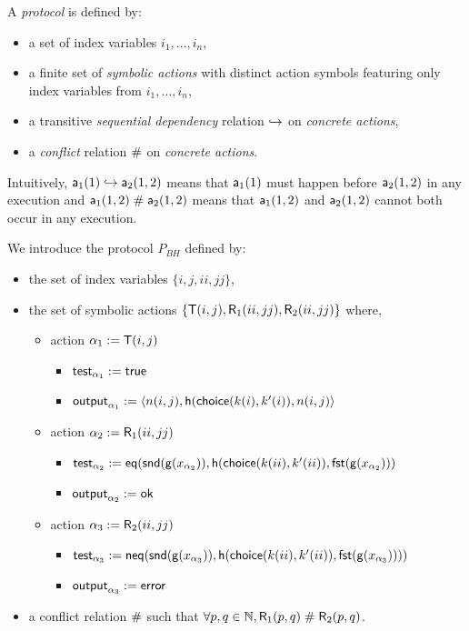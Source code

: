 \begin{definition}
  \label{def:proto}
  A \emph{protocol} is defined by:
  \begin{itemize}
    \item a set of index variables $i_1,\dots,i_n$,
    \item a finite set of \emph{symbolic actions} with distinct action symbols featuring only index variables from $i_1,\dots,i_n$,
    \item a transitive \emph{sequential dependency} relation $\hookrightarrow$ on \emph{concrete actions},
    \item a \emph{conflict} relation $\mathrel{\#}$ on \emph{concrete actions}.
  \end{itemize}
  Intuitively, $\textsf{a}_1(1)\hookrightarrow\textsf{a}_2(1,2)$ means that $\textsf{a}_1(1)$ must happen before $\textsf{a}_2(1,2)$ in any execution
  and $\textsf{a}_1(1,2)\mathrel{\#}\textsf{a}_2(1,2)$ means that $\textsf{a}_1(1,2)$ and $\textsf{a}_2(1,2)$ cannot both occur in any execution.
\end{definition}

\begin{example}
  \label{ex:basic-hash-bi-process}
  We introduce the protocol $P_{BH}$ defined by:
  \begin{itemize}
    \item the set of index variables $\{i,j,ii,jj\}$,
    \item the set of symbolic actions $\{\textsf{T}(i,j),\textsf{R}_1(ii,jj),\textsf{R}_2(ii,jj)\}$ where,
    \begin{itemize}
      \item action $\alpha_1 := \textsf{T}(i,j)$
        \begin{itemize}
          \item $\textsf{test}_{\alpha_1} := \textsf{true}$
          \item $\textsf{output}_{\alpha_1} := \langle n(i,j), \mathsf{h}(\mathsf{choice}(k(i),k'(i)),n(i,j) \rangle$
        \end{itemize}
      \item action $\alpha_2 := \textsf{R}_1(ii,jj)$
        \begin{itemize}
          \item $\textsf{test}_{\alpha_2} := \mathsf{eq}(\mathsf{snd}(\mathsf{g}(x_{\alpha_2})),  \mathsf{h}(\mathsf{choice}(k(ii),k'(ii)),\mathsf{fst}(\mathsf{g}(x_{\alpha_2})))$
          \item $\textsf{output}_{\alpha_2} := \mathsf{ok}$
        \end{itemize}
      \item action $\alpha_3 := \textsf{R}_2(ii,jj)$
        \begin{itemize}
          \item $\textsf{test}_{\alpha_3} := \mathsf{neq} (\mathsf{snd}(\mathsf{g}(x_{\alpha_3})),  \mathsf{h}(\mathsf{choice}(k(ii),k'(ii)),\mathsf{fst}(\mathsf{g}(x_{\alpha_3}))))$
          \item $\textsf{output}_{\alpha_3} := \mathsf{error}$
        \end{itemize}
    \end{itemize}
    \item a conflict relation $\mathrel{\#}$ such that $\forall p,q \in \mathbb{N}, \textsf{R}_1(p,q)\mathrel{\#}\textsf{R}_2(p,q)$.
  \end{itemize}
\end{example}

